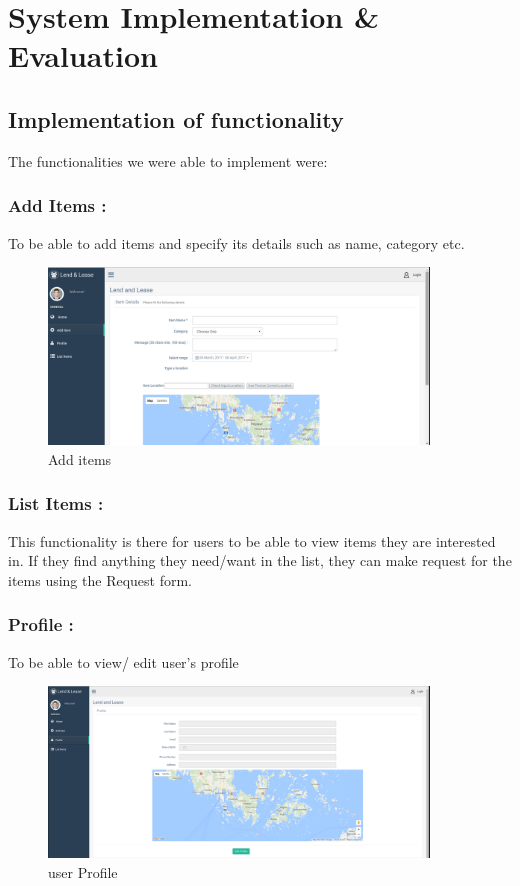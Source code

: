 \documentclass[a4paper]{article}
\begin{document}
\section{System Implementation \& Evaluation}
\subsection{Implementation of functionality}
The functionalities we were able to implement were: 
\subsubsection{Add Items :} To be able to add items and specify its details such as name, category etc.
\begin{figure}[H] 
  \centering
  \includegraphics[width=0.9\textwidth]{addItems.PNG}\hfill
  \caption{Add items}\label{additems}
\end{figure}

\subsubsection{List Items :}  This functionality is there for users to be able to view items they are interested in. If they find anything they need/want in the list, they can make request for the items using the Request form.

\subsubsection{Profile :} To be able to view/ edit user's profile
\begin{figure}[H] 
  \centering
  \includegraphics[width=0.9\textwidth]{profile.PNG}\hfill
  \caption{user Profile}\label{profile}
\end{figure}
\end{document}
